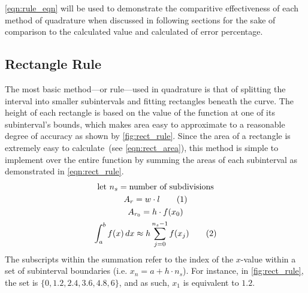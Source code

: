 \documentclass{paper}
\begin{document}
\cref{eqn:rule_eqn} will be used to demonstrate the comparitive effectiveness of each method of quadrature when discussed in following sections for the sake of comparison to the calculated value and calculated of error percentage.
%
\subsection{Rectangle Rule}
\label{sec:rect_rule}
The most basic method---or rule---used in quadrature is that of splitting the interval into smaller subintervals and fitting rectangles beneath the curve.
The height of each rectangle is based on the value of the function at one of its subinterval's bounds, which makes area easy to approximate to a reasonable degree of accuracy as shown by \cref{fig:rect_rule}.
Since the area of a rectangle is extremely easy to calculate~(see \cref{eqn:rect_area}), this method is simple to implement over the entire function by summing the areas of each subinterval as demonstrated in \cref{eqn:rect_rule}.\autocite{num_methods}
%
\begin{gather*}
    \text{let } n_s = \text{number of subdivisions}                                             \\
    A_{r} = w \cdot l \tageq\label{eqn:rect_area}                                               \\
    A_{r_{0}} = h \cdot f(x_0)                                                                  \\
    \int_a^b f(x) \,dx \approx h \sum^{n_s-1}_{j=0}f(x_j) \tageq\label{eqn:rect_rule}
\end{gather*}
%
The subscripts within the summation refer to the index of the \(x\)-value within a set of subinterval boundaries (i.e. \(x_n = a + h \cdot n_s\)).
For instance, in \cref{fig:rect_rule}, the set is \(\{0, 1.2, 2.4, 3.6, 4.8, 6\}\), and as such, \(x_1\) is equivalent to \(1.2\).
\end{document}
